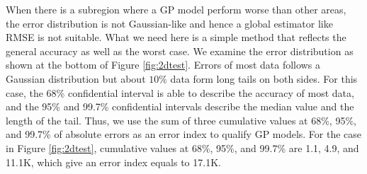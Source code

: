 When there is a subregion where a GP model perform worse than other areas, the error distribution is not Gaussian-like and hence a global estimator like RMSE is not suitable. What we need here is a simple method that reflects the general accuracy as well as the worst case.
We examine the error distribution as shown at the bottom of Figure \ref{fig:2dtest}. Errors of most data follows a Gaussian distribution but about $10\%$ data form long tails on both sides. For this case, the 68\% confidential interval is able to describe the accuracy of most data, and the 95\% and 99.7\% confidential intervals describe the median value and the length of the tail. Thus, we use the sum of three cumulative values at 68\%, 95\%, and 99.7\% of absolute errors as an error index to qualify GP models. For the case in Figure \ref{fig:2dtest}, cumulative values at 68\%, 95\%, and 99.7\% are 1.1, 4.9, and 11.1K, which give an error index equals to 17.1K. 


